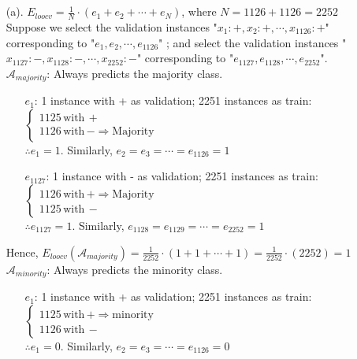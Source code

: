 \documentclass[a4paper,12pt]{article}
\begin{document}
\section{}
\begin{itemize}
 \item [(a).] $\displaystyle E_{loocv}= \frac{1}{N} \cdot (e_{1}+e_{2}+ \cdots +e_{N})$, where $N=1126+1126=2252$ \\
  Suppose we select the validation instances "$x_{1}:+, x_{2}:+, \cdots, x_{1126}:+$" corresponding to "$e_{1}, e_{2}, \cdots, e_{1126}$" ; and select the validation instances "$x_{1127}:-, x_{1128}:-, \cdots, x_{2252}:-$" corresponding to "$e_{1127}, e_{1128}, \cdots, e_{2252}$". \\
  \newline
  $\mathcal{A}_{majority}$: Always predicts the majority class.
  \begin{itemize}
   \item [$e_{1}$:] 1 instance with + as validation; 2251 instances as train: $\begin{cases}
1125 \, \text{with} \, + \\
1126 \, \text{with} \, - \Rightarrow \text{Majority}
\end{cases}$\\
   $\therefore e_{1}=1$. Similarly, $e_{2}=e_{3}= \cdots =e_{1126}=1$
   
   \item [$e_{1127}$:] 1 instance with - as validation; 2251 instances as train: $\begin{cases}
1126 \, \text{with} \, + \Rightarrow \text{Majority} \\
1125 \, \text{with} \, - 
\end{cases}$\\
   $\therefore e_{1127}=1$. Similarly, $e_{1128}=e_{1129}= \cdots =e_{2252}=1$
  \end{itemize}
  Hence, $E_{loocv}(\mathcal{A}_{majority})= \frac{1}{2252} \cdot (1+1+ \cdots +1)=\frac{1}{2252}\cdot(2252)=1$\\
 \newline
 $\mathcal{A}_{minority}$: Always predicts the minority class.
  \begin{itemize}
   \item [$e_{1}$:] 1 instance with + as validation; 2251 instances as train: $\begin{cases}
1125 \, \text{with} \, + \Rightarrow \text{minority} \\
1126 \, \text{with} \, - \
\end{cases}$\\
   $\therefore e_{1}=0$. Similarly, $e_{2}=e_{3}= \cdots =e_{1126}=0$
   

\end{itemize}
\end{itemize}
\end{document}
